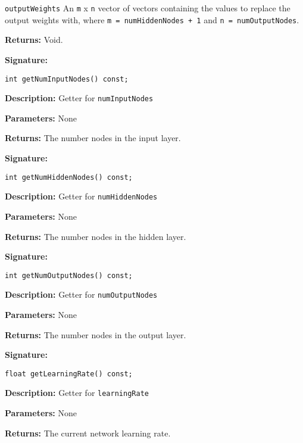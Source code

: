 \documentclass[a4paper]{article}
\begin{document}
\lstinline{outputWeights} An \lstinline{m} x \lstinline{n} vector of vectors containing the values to replace the output weights with, where \lstinline{m = numHiddenNodes + 1} and \lstinline{n = numOutputNodes}.

\textbf{Returns: } Void.

\hrulefill %

\textbf{Signature:} \begin{lstlisting}
int getNumInputNodes() const;
\end{lstlisting}

\textbf{Description: }
Getter for \lstinline{numInputNodes}

\textbf{Parameters: } None

\textbf{Returns: }
The number nodes in the input layer.

\hrulefill %

\textbf{Signature:} \begin{lstlisting}
int getNumHiddenNodes() const;
\end{lstlisting}

\textbf{Description: }
Getter for \lstinline{numHiddenNodes}

\textbf{Parameters: } None

\textbf{Returns: }
The number nodes in the hidden layer.

\hrulefill %

\textbf{Signature:} \begin{lstlisting}
int getNumOutputNodes() const;
\end{lstlisting}

\textbf{Description: }
Getter for \lstinline{numOutputNodes}

\textbf{Parameters: } None

\textbf{Returns: }
The number nodes in the output layer.

\hrulefill %

\textbf{Signature:} \begin{lstlisting}
float getLearningRate() const;
\end{lstlisting}

\textbf{Description: }
Getter for \lstinline{learningRate}

\textbf{Parameters: } None

\textbf{Returns: }
The current network learning rate.
\end{document}
